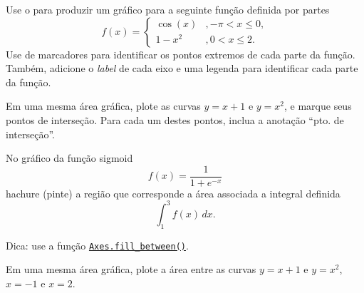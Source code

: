\begin{exer}
  Use o {\matplotlib} para produzir um gráfico para a seguinte função definida por partes
  \begin{equation}
    f(x) = \left\{
      \begin{array}{ll}
        \cos(x) &, -\pi < x \leq 0,\\
        1-x^2 &, 0 < x \leq 2.
      \end{array}
    \right.
  \end{equation}
  Use de marcadores para identificar os pontos extremos de cada parte da função. Também, adicione o \textit{label} de cada eixo e uma legenda para identificar cada parte da função.
\end{exer}

\begin{exer}
  Em uma mesma área gráfica, plote as curvas $y = x + 1$ e $y = x^2$, e marque seus pontos de interseção. Para cada um destes pontos, inclua a anotação ``pto. de interseção''.
\end{exer}

\begin{exer}
  No gráfico da função sigmoid
  \begin{equation}
    f(x) = \frac{1}{1 + e^{-x}}
  \end{equation}
  hachure (pinte) a região que corresponde a área associada a integral definida
  \begin{equation}
    \int_1^3 f(x)\,dx.
  \end{equation}
\end{exer}
\begin{resp}
  Dica: use a função \href{https://matplotlib.org/stable/api/_as_gen/matplotlib.axes.Axes.fill_between.html#matplotlib.axes.Axes.fill_between}{\lstinline+Axes.fill_between()+}.
\end{resp}

\begin{ex}
  Em uma mesma área gráfica, plote a área entre as curvas $y = x + 1$ e $y = x^2$, $x=-1$ e $x=2$.
\end{ex}
